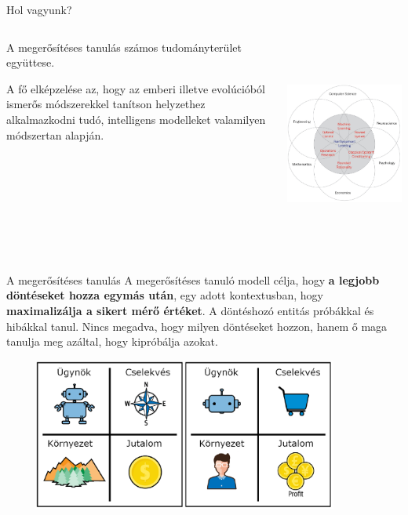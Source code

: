 \documentclass[english, aspectratio=169]{beamer}
\begin{document}
\begin{frame}{Hol vagyunk?}
\begin{columns}
\begin{column}{.5\textwidth}
A megerősítéses tanulás számos tudományterület együttese.\par\smallskip
A fő elképzelése az, hogy az emberi illetve evolúcióból ismerős módszerekkel tanítson helyzethez alkalmazkodni tudó, intelligens modelleket valamilyen módszertan alapján. 
\end{column}
\begin{column}{.5\textwidth}
\begin{center}
\includegraphics[height=7cm, width=12cm, keepaspectratio]{images/reinf_1.png}
\end{center}
\end{column}
\end{columns}
\end{frame}

\begin{frame}{A megerősítéses tanulás}
A megerősítéses tanuló modell célja, hogy \textbf{a legjobb döntéseket hozza egymás után}, egy adott kontextusban, hogy \textbf{maximalizálja a sikert mérő értéket}. A döntéshozó entitás próbákkal és hibákkal tanul. Nincs megadva, hogy milyen döntéseket hozzon, hanem ő maga tanulja meg azáltal, hogy kipróbálja azokat.
\begin{center}
\includegraphics[width=12cm, height=5cm, keepaspectratio]{images/reinf_2.png}
\end{center}
\end{frame}
\end{document}
